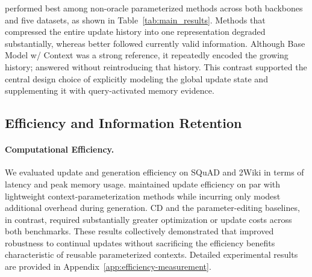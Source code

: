 \method{} performed best among non-oracle parameterized methods across both backbones and five datasets, as shown in Table~\ref{tab:main_results}.
Methods that compressed the entire update history into one representation degraded substantially, whereas \method{} better followed currently valid information.
Although Base Model w/ Context was a strong reference, it repeatedly encoded the growing history; \method{} answered without reintroducing that history.
This contrast supported the central design choice of explicitly modeling the global update state and supplementing it with query-activated memory evidence.


\subsection{Efficiency and Information Retention}
\label{sec:efficiency_locality}

\paragraph{Computational Efficiency.}
We evaluated update and generation efficiency on SQuAD and 2Wiki in terms of latency and peak memory usage. 
\method{} maintained update efficiency on par with lightweight context-parameterization methods while incurring only modest additional overhead during generation. 
CD and the parameter-editing baselines, in contrast, required substantially greater optimization or update costs across both benchmarks. 
These results collectively demonstrated that \method{} improved robustness to continual updates without sacrificing the efficiency benefits characteristic of reusable parameterized contexts. 
Detailed experimental results are provided in Appendix~\ref{app:efficiency-measurement}.


